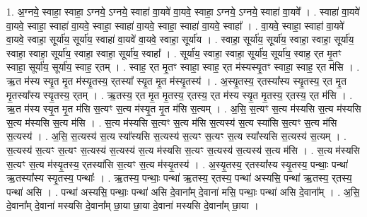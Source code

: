 \documentclass[17pt]{extarticle}
\begin{document}
1. अ॒ग्नये॒ स्वाहा॒ स्वाहा॒ ऽग्नये॒ ऽग्नये॒ स्वाहा॑ वा॒यवे॑ वा॒यवे॒ स्वाहा॒ ऽग्नये॒ ऽग्नये॒ स्वाहा॑ वा॒यवे᳚ । . स्वाहा॑ वा॒यवे॑ वा॒यवे॒ स्वाहा॒ स्वाहा॑ वा॒यवे॒ स्वाहा॒ स्वाहा॑ वा॒यवे॒ स्वाहा॒ स्वाहा॑ वा॒यवे॒ स्वाहा᳚ । . वा॒यवे॒ स्वाहा॒ स्वाहा॑ वा॒यवे॑ वा॒यवे॒ स्वाहा॒ सूर्या॑य॒ सूर्या॑य॒ स्वाहा॑ वा॒यवे॑ वा॒यवे॒ स्वाहा॒ सूर्या॑य । . स्वाहा॒ सूर्या॑य॒ सूर्या॑य॒ स्वाहा॒ स्वाहा॒ सूर्या॑य॒ स्वाहा॒ स्वाहा॒ सूर्या॑य॒ स्वाहा॒ स्वाहा॒ सूर्या॑य॒ स्वाहा᳚ । . सूर्या॑य॒ स्वाहा॒ स्वाहा॒ सूर्या॑य॒ सूर्या॑य॒ स्वाह॒ र्‌त मृ॒तꣳ स्वाहा॒ सूर्या॑य॒ सूर्या॑य॒ स्वाह॒ र्‌तम् । . स्वाह॒ र्‌त मृ॒तꣳ स्वाहा॒ स्वाह॒ र्‌त म॑स्यस्यृ॒तꣳ स्वाहा॒ स्वाह॒ र्‌त म॑सि । . ऋ॒त म॑स्य स्यृ॒त मृ॒त म॑स्यृ॒तस्य॒ र्‌तस्या᳚ स्यृ॒त मृ॒त म॑स्यृ॒तस्य॑ । . अ॒स्यृ॒तस्य॒ र्‌तस्या᳚स्य स्यृ॒तस्य॒ र्‌त मृ॒त मृ॒तस्या᳚स्य स्यृ॒तस्य॒ र्‌तम् । . ऋ॒तस्य॒ र्‌त मृ॒त मृ॒तस्य॒ र्‌तस्य॒ र्‌त म॑स्य स्यृ॒त मृ॒तस्य॒ र्‌तस्य॒ र्‌त म॑सि । . ऋ॒त म॑स्य स्यृ॒त मृ॒त म॑सि स॒त्यꣳ स॒त्य म॑स्यृ॒त मृ॒त म॑सि स॒त्यम् । . अ॒सि॒ स॒त्यꣳ स॒त्य म॑स्यसि स॒त्य म॑स्यसि स॒त्य म॑स्यसि स॒त्य म॑सि । . स॒त्य म॑स्यसि स॒त्यꣳ स॒त्य म॑सि स॒त्यस्य॑ स॒त्य स्या॑सि स॒त्यꣳ स॒त्य म॑सि स॒त्यस्य॑ । . अ॒सि॒ स॒त्यस्य॑ स॒त्य स्या᳚स्यसि स॒त्यस्य॑ स॒त्यꣳ स॒त्यꣳ स॒त्य स्या᳚स्यसि स॒त्यस्य॑ स॒त्यम् । . स॒त्यस्य॑ स॒त्यꣳ स॒त्यꣳ स॒त्यस्य॑ स॒त्यस्य॑ स॒त्य म॑स्यसि स॒त्यꣳ स॒त्यस्य॑ स॒त्यस्य॑ स॒त्य म॑सि । . स॒त्य म॑स्यसि स॒त्यꣳ स॒त्य म॑स्यृ॒तस्य॒ र्‌तस्या॑सि स॒त्यꣳ स॒त्य म॑स्यृ॒तस्य॑ । . अ॒स्यृ॒तस्य॒ र्‌तस्या᳚स्य स्यृ॒तस्य॒ पन्थाः॒ पन्था॑ ऋ॒तस्या᳚स्य स्यृ॒तस्य॒ पन्थाः᳚ । . ऋ॒तस्य॒ पन्थाः॒ पन्था॑ ऋ॒तस्य॒ र्‌तस्य॒ पन्था॑ अस्यसि॒ पन्था॑ ऋ॒तस्य॒ र्‌तस्य॒ पन्था॑ असि । . पन्था॑ अस्यसि॒ पन्थाः॒ पन्था॑ असि दे॒वाना᳚म् दे॒वाना॑ मसि॒ पन्थाः॒ पन्था॑ असि दे॒वाना᳚म् । . अ॒सि॒ दे॒वाना᳚म् दे॒वाना॑ मस्यसि दे॒वाना᳚म् छा॒या छा॒या दे॒वाना॑ मस्यसि दे॒वाना᳚म् छा॒या । \newline
\end{document}
